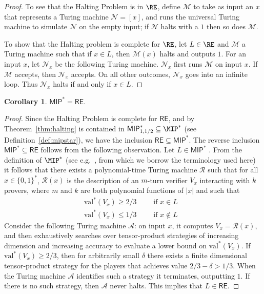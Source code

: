 \documentclass[11pt]{article}
\newtheorem{corollary}[theorem]{Corollary}
\theoremstyle{definition}
\newcommand{\val}{\ensuremath{\mathrm{val}}}
\renewcommand{\cal}[1]{\mathcal{#1}}
\begin{document}
\begin{proof}
  To see that the Halting Problem is in $\RE$, define $\cal{M}$ to take as input
  an $x$ that represents a Turing machine $\cal{N} = [x]$, and runs the
  universal Turing machine to simulate $\cal{N}$ on the empty input; if $\cal{N}$
  halts with a $1$ then so does $\cal{M}$.

  To show that the Halting problem is complete for $\RE$, let $L\in \RE$ and
  $\cal{M}$ a Turing machine such that if $x \in L$, then $\cal{M}(x)$ halts and
  outputs $1$.
  For an input $x$, let $\cal{N}_x$ be the following Turing machine.
  $\cal{N}_x$ first runs $\cal{M}$ on input $x$.
  If $\cal{M}$ accepts, then $\cal{N}_x$ accepts.
  On all other outcomes, $\cal{N}_x$ goes into an infinite loop.
  Thus $\cal{N}_x$ halts if and only if $x \in L$. 
\end{proof}

\begin{corollary}\label{cor:mip-re}
	$\mathsf{MIP}^* = \mathsf{RE}$.
\end{corollary}
\begin{proof}
	Since the Halting Problem is complete for $\mathsf{RE}$, and by
  Theorem~\ref{thm:halting} is contained in $\mathsf{MIP}^*_{1,1/2}\subseteq \MIP^*$ (see Definition~\ref{def:mipstar}), we have the
  inclusion $\mathsf{RE} \subseteq \mathsf{MIP}^*$.
  The reverse inclusion $\mathsf{MIP}^* \subseteq \mathsf{RE}$ follows from the
  following observation.
  Let $L \in \mathsf{MIP}^*$ .
  From the definition of $\MIP^*$ (see e.g.~\cite[Section
  6.1]{vidick2016quantum}, from which we borrow the terminology used here) it
  follows that there exists a polynomial-time Turing machine $\cal{R}$ such that
  for all $x \in \{0,1\}^*$, $\cal{R}(x)$ is the description of an $m$-turn
  verifier $V_x$ interacting with $k$ provers, where $m$ and $k$ are both
  polynomial functions of $|x|$ and such that
	\begin{gather*}
		\val^*(V_x) \geq 2/3 \qquad \text{ if $x \in L$ } \\
		\val^*(V_x)	\leq 1/3 \qquad \text{ if $x \notin L$ }
	\end{gather*}
	Consider the following Turing machine $\cal{A}$: on input $x$, it computes
  $V_x = \cal{R}(x)$, and then exhaustively searches over tensor-product
  strategies of increasing dimension and increasing accuracy to evaluate a lower
  bound on $\val^*(V_x)$.
  If $\val^*(V_x) \geq 2/3$, then for arbitrarily small $\delta$ there exists a
  finite dimensional tensor-product strategy for the players that achieves value
  $2/3 - \delta > 1/3$.
  When the Turing machine $\cal{A}$ identifies such a strategy it terminates,
  outputting $1$.
  If there is no such strategy, then $\cal{A}$ never halts.
  This implies that $L \in \mathsf{RE}$.
\end{proof}
	
\end{document}
